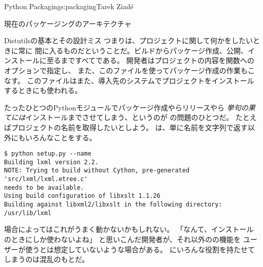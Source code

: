 \begin{aosachapter}{Python Packaging}{s:packaging}{Tarek Ziad\'{e}}
\begin{aosasect1}{現在のパッケージングのアーキテクチャ}
\begin{aosasect2}{Distutilsの基本とその設計ミス}
\noindent
つまりは、プロジェクトに関して何かをしたいときに常に
間に入るものだということだ。ビルドからパッケージ作成、公開、インストールに至るまですべてである。
開発者はプロジェクトの内容を関数へのオプションで指定し、
また、このファイルを使ってパッケージ作成の作業もこなす。
このファイルはまた、導入先のシステムでプロジェクトをインストールするときにも使われる。


たったひとつのPythonモジュールでパッケージ作成やらリリースやら
\emph{挙句の果てには}インストールまでさせてしまう、というのが
の問題のひとつだ。
たとえばプロジェクトの名前を取得したいとしよう。
は、単に名前を文字列で返す以外にもいろんなことをする。

\begin{verbatim}
$ python setup.py --name
Building lxml version 2.2.
NOTE: Trying to build without Cython, pre-generated 'src/lxml/lxml.etree.c'
needs to be available.
Using build configuration of libxslt 1.1.26
Building against libxml2/libxslt in the following directory: /usr/lib/lxml
\end{verbatim}

\noindent
場合によってはこれがうまく動かないかもしれない。
「なんて、インストールのときにしか使わないよね」
と思いこんだ開発者が、それ以外のの機能を
ユーザーが使うとは想定していないような場合がある。
にいろんな役割を持たせてしまうのは混乱のもとだ。


\end{aosasect2}
\end{aosasect1}
\end{aosachapter}
